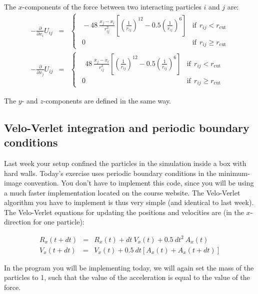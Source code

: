 \documentclass{article}
\begin{document}
The $x$-components of the force between two interacting particles $i$ and $j$ are:
\begin{eqnarray}
    -\frac{\partial}{\partial x_i} U_{ij}&=& 
    \begin{cases}
        \ \ -48\ \frac{x_j - x_i}{r^2_{ij}}
        \left[ \left(\frac{1}{r_{ij}} \right)^{12} - 0.5 \left(\frac{1}{r_{ij}} \right)^6 \right]
        & \mathrm{if}\ \ r_{ij} < r_{\mathrm{cut}} \\
        \ \ 0 & \mathrm{if}\ \ r_{ij} \ge  r_{\mathrm{cut}}
    \end{cases}\label{eq:force_i}\\
    -\frac{\partial}{\partial x_j} U_{ij}&=&
    \begin{cases}
        \ \ \ \ 48\ \frac{x_j - x_i}{r^2_{ij}}
        \left[ \left(\frac{1}{r_{ij}} \right)^{12} - 0.5 \left(\frac{1}{r_{ij}} \right)^6 \right]
        & \mathrm{if}\ \ r_{ij} < r_{\mathrm{cut}} \\
        \ \ 0 & \mathrm{if}\ \ r_{ij} \ge  r_{\mathrm{cut}}
    \end{cases}\label{eq:force_j}
\end{eqnarray}

The $y$- and $z$-components are defined in the same way.

\subsection{Velo-Verlet integration and periodic boundary conditions}

Last week your setup confined the particles in the simulation inside a box with hard walls.
Today's exercise uses periodic boundary conditions in the minimum-image convention.
%
You don't have to implement this code, since you will be using a much faster implementation located on the course website.
The Velo-Verlet algorithm you have to implement is thus very simple (and identical to last week).
The Velo-Verlet equations for updating the positions and velocities are (in the $x$-direction for one particle):

\begin{eqnarray}
    R_x(t + dt) &=& R_x(t) + dt\ V_x(t) + 0.5\ dt^2\ A_x(t) \label{eq:position_x}\\
    V_x(t + dt) &=& V_x(t) + 0.5\ dt \left[A_x(t) + A_x(t+dt)\right] \label{eq:speed_x}
\end{eqnarray}

In the program you will be implementing today, we will again set the mass of the particles to 1, such that the value of the acceleration is equal to the value of the force.\\
\end{document}
